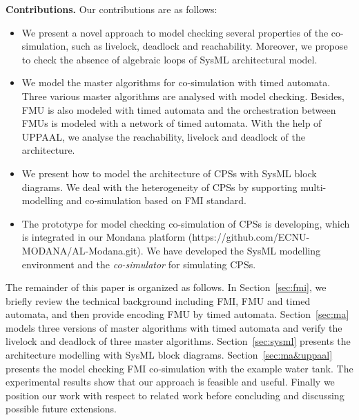 \textbf{Contributions.} Our contributions are as follows:
\begin{itemize}
\item
We present a novel approach to model checking several properties of the co-simulation, such as livelock, deadlock and reachability. Moreover, we propose to check the absence of algebraic loops of SysML architectural model.
\item
We model the master algorithms for co-simulation with timed automata. Three various master algorithms are analysed with model checking. Besides, FMU is also modeled with timed automata and the orchestration between FMUs is modeled with a network of timed automata. With the help of UPPAAL, we analyse the reachability, livelock and deadlock of the architecture.
\item
We present how to model the architecture of CPSs with SysML block diagrams. We deal with the heterogeneity of CPSs by supporting multi-modelling and co-simulation based on FMI standard.
\item
The prototype for model checking co-simulation of CPSs is developing, which is integrated in our Mondana platform \cite{Cheng2015Modana}(https://github.com/ECNU-MODANA/AL-Modana.git). We have developed the SysML modelling environment and the \textit{co-simulator }for simulating CPSs\cite{Fritzson1998Modelica}.
\end{itemize}
The remainder of this paper is organized as follows. In Section~\ref{sec:fmi}, we briefly review the technical background including FMI, FMU and timed automata, and then provide encoding FMU by timed automata.
Section~\ref{sec:ma} models three versions of master algorithms with timed automata and verify the livelock and deadlock of three master algorithms.
Section~\ref{sec:sysml} presents the architecture modelling with SysML block diagrams.
Section~\ref{sec:ma&uppaal} presents the model checking FMI co-simulation with the example water tank. The experimental results show that our approach is feasible and useful. 
Finally we position our work with respect to related work before concluding and discussing possible future extensions.




















